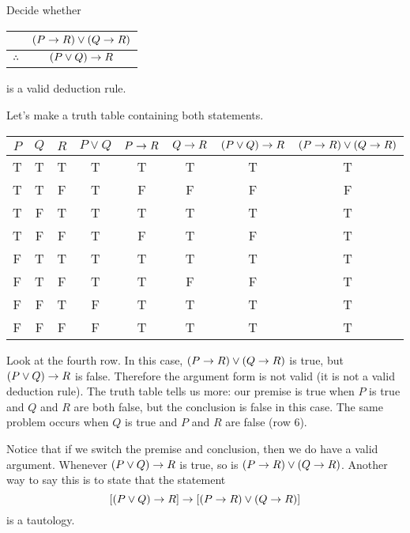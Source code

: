 \documentclass[12pt]{article}
\begin{document}
\begin{example}
 Decide whether
  \begin{tabular}{rc}
   &  $(P \rightarrow R) \vee (Q \rightarrow R)$ \\ \hline
 $\therefore$  & $(P \vee Q) \rightarrow R$
  \end{tabular}
is a valid deduction rule.
\begin{solution}
 Let's make a truth table containing both statements. 
 
 \begin{center}
 \begin{tabular}{c|c|c||c|c|c|c|c}
  $P$ & $Q$ & $R$ & $P\vee Q$ & $P \rightarrow R$ & $Q \rightarrow R$ & $(P\vee Q) \rightarrow R$ 	& $(P\rightarrow R) \vee (Q \rightarrow R)$ \\ \hline
  T   & T   & T   & T         & T          & T  	 & T 			& T \\
  T   & T   & F   & T         & F          & F 	 & F			& F \\
  T   & F   & T   & T         & T 	    & T 	 & T			& T \\
  T   & F   & F   & T		& F 	    & T 	 & F			& T \\
  F   & T   & T   & T 		& T 	    & T          & T			& T \\  
  F   & T   & F   & T 		& T 	    & F          & F			& T \\  
  F   & F   & T   & F 		& T 	    & T          & T			& T \\  
  F   & F   & F   & F 		& T 	    & T          & T			& T \\  
  
 \end{tabular}
  \end{center}
  
  Look at the fourth row.  In this case, $(P \rightarrow R) \vee (Q \rightarrow R)$ is true, but $(P \vee Q) \rightarrow R$ is false.  Therefore the argument form is not valid (it is not a valid deduction rule).  The truth table tells us more: our premise is true when $P$ is true and $Q$ and $R$ are both false, but the conclusion is false in this case.  The same problem occurs when $Q$ is true and $P$ and $R$ are false (row 6).  
  
  Notice that if we switch the premise and conclusion, then we do have a valid argument. Whenever $(P\vee Q) \rightarrow R$ is true, so is $(P \rightarrow R) \vee (Q \rightarrow R)$.  Another way to say this is to state that the statement
  \[[(P \vee Q) \rightarrow R] \rightarrow [(P \rightarrow R) \vee (Q \rightarrow R)]\]
  is a tautology.
\end{solution}
\end{example}
\end{document}
